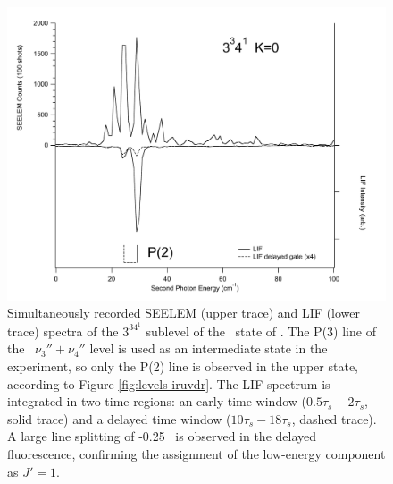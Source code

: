 \documentclass[12pt]{mitthesis}
\begin{document}
\begin{figure}
  \caption{Simultaneously recorded SEELEM (upper trace) and LIF (lower
    trace) spectra of the $3^34^1$  sublevel of the \astate\
    state of .  The P(3) line of the \xstate\ $\nu_3'' +
    \nu_4''$ level is used as an intermediate state in the experiment,
    so only the P(2) line is observed in the upper state, according to
    Figure \ref{fig:levels-iruvdr}.  The LIF spectrum is integrated in
    two time regions: an early time window ($0.5\tau_s-2\tau_s$, solid
    trace) and a delayed time window ($10\tau_s-18\tau_s$, dashed
    trace).  A large line splitting of -0.25 \rcm\ is observed in the
    delayed fluorescence, confirming the assignment of the low-energy
    component as $J'=1$.  \TODO{Calibration.}}
  \label{fig:3341-p2}
  \centering
  \includegraphics[width=6in]{spectrum-3341-p2-split.pdf}
\end{figure}

\end{document}
